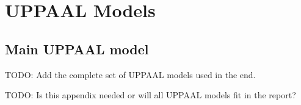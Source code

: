 \chapter{UPPAAL Models}

\section{Main UPPAAL model}
TODO: Add the complete set of UPPAAL models used in the end.

TODO: Is this appendix needed or will all UPPAAL models fit in the report?
